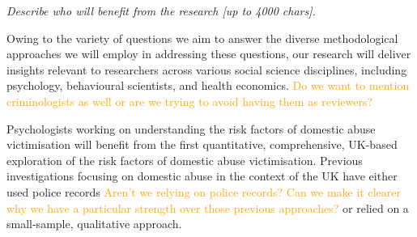 \documentclass[11pt, a4paper]{article}
\newcommand{\TM}[1] {{\textcolor{orange}{#1}}}
\begin{document}
%
%
%
%
%
%
%
%
%
%
%
%
%
%
%

\textit{Describe who will benefit from the research [up to 4000 chars].}

Owing to the variety of questions we aim to answer the diverse methodological approaches we will employ in addressing these questions, our research will deliver insights relevant to researchers across various social science disciplines, including psychology, behavioural scientists, and health economics. \TM{Do we want to mention criminologists as well or are we trying to avoid having them as reviewers?}

Psychologists working on understanding the risk factors of domestic abuse victimisation will benefit from the first quantitative, comprehensive, UK-based exploration of the risk factors of domestic abuse victimisation. Previous investigations focusing on domestic abuse in the context of the UK have either used police records \TM{Aren't we relying on police records? Can we make it clearer why we have a particular strength over those previous approaches?} or relied on a small-sample, qualitative approach.
\end{document}
